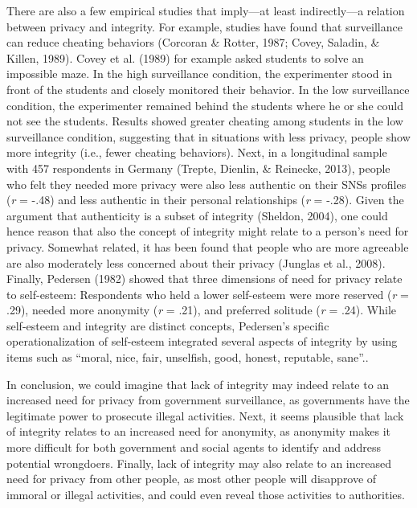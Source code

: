 \documentclass[man,floatsintext]{apa6}
\begin{document}
There are also a few empirical studies that imply---at least indirectly---a relation between privacy and integrity. For example, studies have found that surveillance can reduce cheating behaviors (Corcoran \& Rotter, 1987; Covey, Saladin, \& Killen, 1989). Covey et al. (1989) for example asked students to solve an impossible maze. In the high surveillance condition, the experimenter stood in front of the students and closely monitored their behavior. In the low surveillance condition, the experimenter remained behind the students where he or she could not see the students. Results showed greater cheating among students in the low surveillance condition, suggesting that in situations with less privacy, people show more integrity (i.e., fewer cheating behaviors). Next, in a longitudinal sample with 457 respondents in Germany (Trepte, Dienlin, \& Reinecke, 2013), people who felt they needed more privacy were also less authentic on their SNSs profiles (\emph{r} = -.48) and less authentic in their personal relationships (\emph{r} = -.28). Given the argument that authenticity is a subset of integrity (Sheldon, 2004), one could hence reason that also the concept of integrity might relate to a person's need for privacy. Somewhat related, it has been found that people who are more agreeable are also moderately less concerned about their privacy (Junglas et al., 2008). Finally, Pedersen (1982) showed that three dimensions of need for privacy relate to self-esteem: Respondents who held a lower self-esteem were more reserved (\emph{r} = .29), needed more anonymity (\emph{r} = .21), and preferred solitude (\emph{r} = .24). While self-esteem and integrity are distinct concepts, Pedersen's specific operationalization of self-esteem integrated several aspects of integrity by using items such as \enquote{moral, nice, fair, unselfish, good, honest, reputable, sane}..

In conclusion, we could imagine that lack of integrity may indeed relate to an increased need for privacy from government surveillance, as governments have the legitimate power to prosecute illegal activities. Next, it seems plausible that lack of integrity relates to an increased need for anonymity, as anonymity makes it more difficult for both government and social agents to identify and address potential wrongdoers. Finally, lack of integrity may also relate to an increased need for privacy from other people, as most other people will disapprove of immoral or illegal activities, and could even reveal those activities to authorities.
\end{document}
